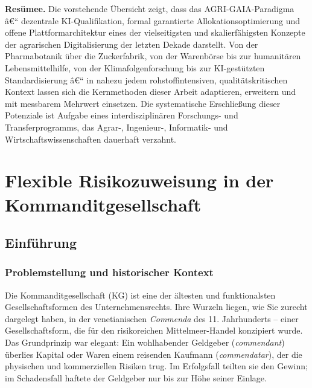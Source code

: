 \documentclass[a4paper, 12pt, twoside, openright]{report}
\theoremstyle{definition}
\theoremstyle{definition}
\begin{document}
\bigskip
\noindent
\textbf{Resümee.}
Die vorstehende Übersicht zeigt, dass das AGRI-GAIA-Paradigma â€“
dezentrale KI-Qualifikation, formal garantierte Allokationsoptimierung
und offene Plattformarchitektur eines der vielseitigsten und
skalierfähigsten Konzepte der agrarischen Digitalisierung der letzten
Dekade darstellt. Von der Pharmabotanik über die Zuckerfabrik, von
der Warenbörse bis zur humanitären Lebensmittelhilfe, von der
Klimafolgenforschung bis zur KI-gestützten Standardisierung â€“
in nahezu jedem rohstoffintensiven, qualitätskritischen Kontext
lassen sich die Kernmethoden dieser Arbeit adaptieren, erweitern und
mit messbarem Mehrwert einsetzen. Die systematische Erschließung
dieser Potenziale ist Aufgabe eines interdisziplinären Forschungs-
und Transferprogramms, das Agrar-, Ingenieur-, Informatik-
und Wirtschaftswissenschaften dauerhaft verzahnt.

\cleardoublepage


\chapter{Flexible Risikozuweisung in der Kommanditgesellschaft}
\label{ch:risk-allocation}

\section{Einführung}

\subsection{Problemstellung und historischer Kontext}

Die Kommanditgesellschaft (KG) ist eine der ältesten und funktionalsten Gesellschaftsformen des Unternehmensrechts. Ihre Wurzeln liegen, wie Sie zurecht dargelegt haben, in der venetianischen \emph{Commenda} des 11. Jahrhunderts -- einer Gesellschaftsform, die für den risikoreichen Mittelmeer-Handel konzipiert wurde. Das Grundprinzip war elegant: Ein wohlhabender Geldgeber (\emph{commendant}) überlies Kapital oder Waren einem reisenden Kaufmann (\emph{commendatar}), der die physischen und kommerziellen Risiken trug. Im Erfolgsfall teilten sie den Gewinn; im Schadensfall haftete der Geldgeber nur bis zur Höhe seiner Einlage.
\end{document}
